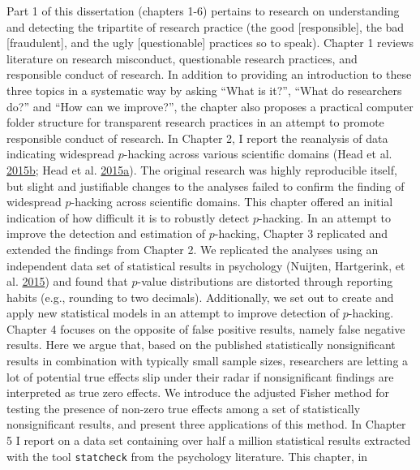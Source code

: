 \documentclass[a5paper]{book}
\begin{document}
Part 1 of this dissertation (chapters 1-6) pertains to research on
understanding and detecting the tripartite of research practice (the
good {[}responsible{]}, the bad {[}fraudulent{]}, and the ugly
{[}questionable{]} practices so to speak). Chapter 1 reviews literature
on research misconduct, questionable research practices, and responsible
conduct of research. In addition to providing an introduction to these
three topics in a systematic way by asking \enquote{What is it?},
\enquote{What do researchers do?} and \enquote{How can we improve?}, the
chapter also proposes a practical computer folder structure for
transparent research practices in an attempt to promote responsible
conduct of research. In Chapter 2, I report the reanalysis of data
indicating widespread \(p\)-hacking across various scientific domains
(Head et al.
\protect\hyperlink{ref-doi:10.1371ux2fjournal.pbio.1002106}{2015}\protect\hyperlink{ref-doi:10.1371ux2fjournal.pbio.1002106}{b};
Head et al.
\protect\hyperlink{ref-doi:10.5061ux2fdryad.79d43}{2015}\protect\hyperlink{ref-doi:10.5061ux2fdryad.79d43}{a}).
The original research was highly reproducible itself, but slight and
justifiable changes to the analyses failed to confirm the finding of
widespread \(p\)-hacking across scientific domains. This chapter offered
an initial indication of how difficult it is to robustly detect
\(p\)-hacking. In an attempt to improve the detection and estimation of
\(p\)-hacking, Chapter 3 replicated and extended the findings from
Chapter 2. We replicated the analyses using an independent data set of
statistical results in psychology (Nuijten, Hartgerink, et al.
\protect\hyperlink{ref-doi:10.3758ux2fs13428-015-0664-2}{2015}) and
found that \(p\)-value distributions are distorted through reporting
habits (e.g., rounding to two decimals). Additionally, we set out to
create and apply new statistical models in an attempt to improve
detection of \(p\)-hacking. Chapter 4 focuses on the opposite of false
positive results, namely false negative results. Here we argue that,
based on the published statistically nonsignificant results in
combination with typically small sample sizes, researchers are letting a
lot of potential true effects slip under their radar if nonsignificant
findings are interpreted as true zero effects. We introduce the adjusted
Fisher method for testing the presence of non-zero true effects among a
set of statistically nonsignificant results, and present three
applications of this method. In Chapter 5 I report on a data set
containing over half a million statistical results extracted with the
tool \texttt{statcheck} from the psychology literature. This chapter, in
\end{document}
